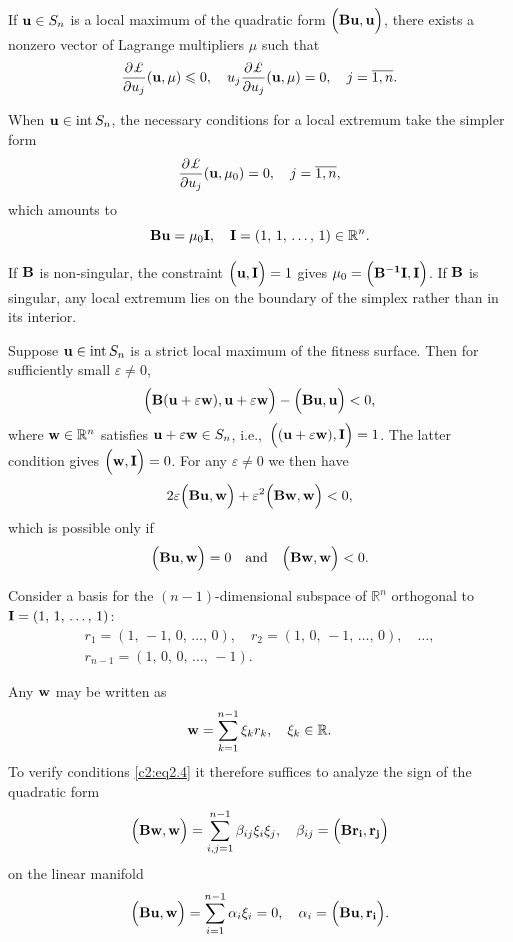 \documentclass[12pt]{report}
\newcommand{\R}{\mathbb{R}}
\newcommand{\inside}{\mathrm{int}\,}
\theoremstyle{definition}
\theoremstyle{remark}
\begin{document}
If ${\bf u} \in S_{n}$ is a local maximum of the quadratic form $\Big({\bf Bu, u}\Big)$, there exists a nonzero vector of Lagrange multipliers $\mu$ such that
$$
\frac{\partial\pounds}{\partial u_{j}}({\bf u}, \mu) \leqslant 0, \quad u_{j}\frac{\partial\pounds}{\partial u_{j}}({\bf u}, \mu) = 0, \quad j = \overline{1, n}.
$$

When ${\bf u} \in \inside S_{n}$, the necessary conditions for a local extremum take the simpler form
$$
\frac{\partial\pounds}{\partial u_{j}}({\bf u}, \mu_{0}) = 0, \quad j = \overline{1, n},
$$
which amounts to
\begin{equation}
	{\bf Bu} = \mu_{0}{\bf I}, \quad {\bf I} = (1,\, 1,\, \ldots,\, 1) \in \R^{n}.
	\label{c2:eq2.3}
\end{equation}

If ${\bf B}$ is non-singular, the constraint $\Big({\bf u, I}\Big) = 1$ gives $\mu_{0} = \Big({\bf B^{-1}I, I}\Big)$. If ${\bf B}$ is singular, any local extremum lies on the boundary of the simplex rather than in its interior.

Suppose ${\bf u} \in \inside S_{n}$ is a strict local maximum of the fitness surface. Then for sufficiently small $\varepsilon \neq 0$,
$$
\Big({\bf B}({\bf u} + \varepsilon{\bf w}), {\bf u} + \varepsilon{\bf w}\Big) - \Big({\bf Bu, u}\Big) < 0, 
$$
where ${\bf w} \in \mathbb{R}^{n}$ satisfies ${\bf u} + \varepsilon{\bf w} \in S_{n}$, i.e.,\ $\Big(({\bf u} + \varepsilon{\bf w}), {\bf I}\Big) = 1$. The latter condition gives $\Big({\bf w, I}\Big) = 0$. For any $\varepsilon \neq 0$ we then have
$$
2\varepsilon\Big({\bf Bu, w}\Big) + \varepsilon^{2}\Big({\bf Bw, w}\Big) < 0,
$$
which is possible only if
\begin{equation}
	\Big({\bf Bu, w}\Big) = 0 \quad \text{and} \quad \Big({\bf Bw, w}\Big) < 0.
	\label{c2:eq2.4}
\end{equation}

Consider a basis for the $(n-1)$-dimensional subspace of $\R^{n}$ orthogonal to ${\bf I} = (1,\, 1,\, \ldots,\, 1)$:
\begin{align*}
	r_{1} = (1,\, -1,\, 0,\, \ldots,\, 0), \quad r_{2} = (1,\, 0,\, -1,\, \ldots,\, 0), \quad \ldots, \\ r_{n - 1} = (1,\, 0,\, 0,\, \ldots,\, -1).
\end{align*} 

Any ${\bf w}$ may be written as
$$
{\bf w} = \sum\limits_{k = 1}^{n - 1}\xi_{k}r_{k}, \quad \xi_{k} \in \R.
$$
To verify conditions \eqref{c2:eq2.4} it therefore suffices to analyze the sign of the quadratic form
$$
\Big({\bf Bw, w}\Big) = \sum\limits_{i, j = 1}^{n - 1}\beta_{ij}\xi_{i}\xi_{j}, \quad \beta_{ij} = \Big({\bf Br_{i}, r_{j}}\Big)
$$
on the linear manifold
$$
\Big({\bf Bu, w}\Big) = \sum\limits_{i = 1}^{n - 1}\alpha_{i}\xi_{i} = 0, \quad \alpha_{i} = \Big({\bf Bu, r_{i}}\Big).
$$
\end{document}
